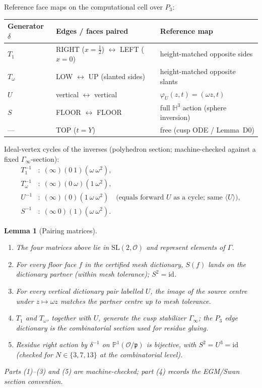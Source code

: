 \documentclass[11pt]{amsart}
\newtheorem{lemma}[theorem]{Lemma}
\newcommand{\HH}{\mathbb{H}^3}
\newcommand{\p}{\mathfrak{p}}
\begin{document}
Reference face maps on the computational cell over $P_3$:
\begin{center}
\begin{tabular}{@{}lll@{}}
\toprule
Generator $\delta$ & Edges / faces paired & Reference map \\
\midrule
$T_1$ & RIGHT ($x=\tfrac12$) $\leftrightarrow$ LEFT ($x=0$)
  & height-matched opposite sides \\
$T_\omega$ & LOW $\leftrightarrow$ UP (slanted sides)
  & height-matched opposite slants \\
$U$ & vertical $\leftrightarrow$ vertical
  & $\varphi_U(z,t)=(\omega z,t)$ \\
$S$ & FLOOR $\leftrightarrow$ FLOOR
  & full $\HH$ action (sphere inversion) \\
--- & TOP ($t=Y$) & free (cusp ODE / Lemma~D0) \\
\bottomrule
\end{tabular}
\end{center}

Ideal-vertex cycles of the inverses (polyhedron section; machine-checked
against a fixed $\Gamma_\infty$-section):
\begin{align*}
  T_1^{-1}&:\;(\infty)(0\ 1)(\omega\ \omega^2),\\
  T_\omega^{-1}&:\;(\infty)(0\ \omega)(1\ \omega^2),\\
  U^{-1}&:\;(\infty)(0)(1\ \omega\ \omega^2)
  \quad\text{(equals forward $U$ as a cycle; same $\langle U\rangle$)},\\
  S^{-1}&:\;(\infty\ 0)(1)(\omega\ \omega^2).
\end{align*}

\begin{lemma}[Pairing matrices]\label{lem:pair}
\begin{enumerate}
\item The four matrices above lie in $\mathrm{SL}(2,\mathcal{O})$ and
  represent elements of $\Gamma$.
\item For every floor face $f$ in the certified mesh dictionary, $S(f)$
  lands on the dictionary partner (within mesh tolerance); $S^2=\mathrm{id}$.
\item For every vertical dictionary pair labelled $U$, the image of the
  source centre under $z\mapsto\omega z$ matches the partner centre up to
  mesh tolerance.
\item $T_1$ and $T_\omega$, together with $U$, generate the cusp
  stabilizer $\Gamma_\infty$; the $P_3$ edge dictionary is the
  combinatorial section used for residue gluing.
\item Residue right action by $\delta^{-1}$ on $\mathbb{P}^1(\mathcal{O}/\p)$
  is bijective, with $S^2=U^3=\mathrm{id}$ (checked for
  $N\in\{3,7,13\}$ at the combinatorial level).
\end{enumerate}
Parts (1)--(3) and (5) are machine-checked; part (4) records the EGM/Swan
section convention.
\end{lemma}
\end{document}
